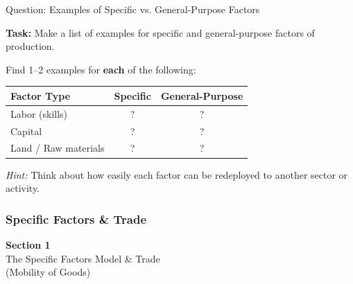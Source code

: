 \documentclass{beamer}
\begin{document}

\begin{frame}{Question: Examples of Specific vs. General-Purpose Factors}

\textbf{Task:} Make a list of examples for specific and general-purpose factors of production.

\vspace{0.3cm}

Find 1--2 examples for \textbf{each} of the following:

\vspace{0.3cm}

\begin{center}
\begin{tabular}{l|c|c}
\toprule
\textbf{Factor Type} & \textbf{Specific} & \textbf{General-Purpose} \\
\midrule
Labor (skills) & ? & ? \\
\midrule
Capital & ? & ? \\
\midrule
Land / Raw materials & ? & ? \\
\bottomrule
\end{tabular}
\end{center}

\vspace{0.5cm}

\textit{Hint:} Think about how easily each factor can be redeployed to another sector or activity.

\end{frame}


\subsubsection{Specific Factors \& Trade}
\begin{frame}

\vspace{2cm}

\centering
{\LARGE \textbf{Section 1}} \\[0.5cm]
{\Large The Specific Factors Model \& Trade} \\[0.3cm]
{\large (Mobility of Goods)}

\vfill

\end{frame}
\end{document}

